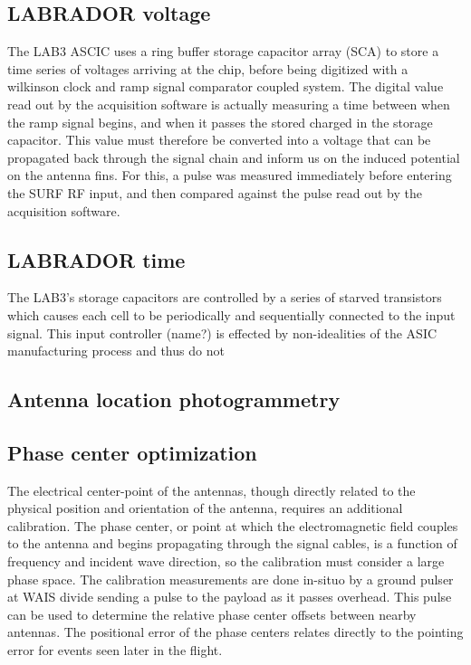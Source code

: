 	\subsection{LABRADOR voltage}
		The LAB3 ASCIC uses a ring buffer storage capacitor array (SCA) to store a time series of voltages arriving at the chip, before being digitized with a wilkinson clock and ramp signal comparator coupled system.  The digital value read out by the acquisition software is actually measuring a time between when the ramp signal begins, and when it passes the stored charged in the storage capacitor.  This value must therefore be converted into a voltage that can be propagated back through the signal chain and inform us on the induced potential on the antenna fins.  For this, a pulse was measured immediately before entering the SURF RF input, and then compared against the pulse read out by the acquisition software.
	\subsection{LABRADOR time}
		The LAB3's storage capacitors are controlled by a series of starved transistors which causes each cell to be periodically and sequentially connected to the input signal.  This input controller (name?) is effected by non-idealities of the ASIC manufacturing process and thus do not 

	\subsection{Antenna location photogrammetry}

	\subsection{Phase center optimization}
		The electrical center-point of the antennas, though directly related to the physical position and orientation of the antenna, requires an additional calibration.  The phase center, or point at which the electromagnetic field couples to the antenna and begins propagating through the signal cables, is a function of frequency and incident wave direction, so the calibration must consider a large phase space.  The calibration measurements are done in-situo by a ground pulser at WAIS divide sending a pulse to the payload as it passes overhead.  This pulse can be used to determine  the relative phase center offsets between nearby antennas.  The positional error of the phase centers relates directly to the pointing error for events seen later in the flight.





